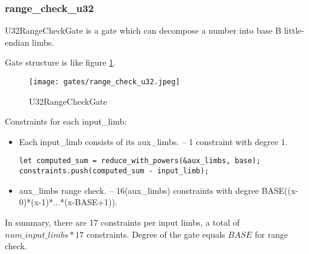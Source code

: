 \subsubsection{range\_check\_u32}

U32RangeCheckGate is a gate which can decompose a number into base B little-endian limbs.

Gate structure is like figure \ref{fig:range-check-u32}.

\begin{figure}[!ht]
    \centering
    \texttt{[image: gates/range\_check\_u32.jpeg]}
    \caption{U32RangeCheckGate}
    \label{fig:range-check-u32}
\end{figure}

Constraints for each input\_limb:
\begin{itemize}
    \item Each input\_limb consists of its aux\_limbs. -- 1 constraint with degree 1.
    \begin{lstlisting}
let computed_sum = reduce_with_powers(&aux_limbs, base);
constraints.push(computed_sum - input_limb);
    \end{lstlisting}
    \item aux\_limbs range check. -- 16(aux\_limbs) constraints with degree BASE((x-0)*(x-1)*...*(x-BASE+1)).
\end{itemize}

In summary, there are 17 constraints per input limbs, a total of $num\_input\_limbs * 17$ constraints. 
Degree of the gate equals $BASE$ for range check.
